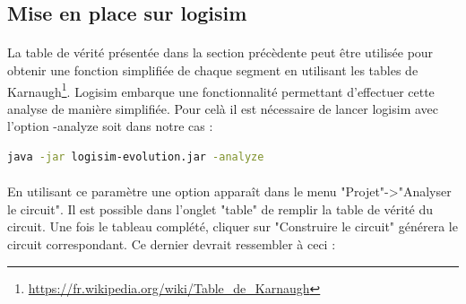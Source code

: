 \subsection{Mise en place sur logisim}
\paragraph{}
La table de vérité présentée dans la section précèdente peut être utilisée pour obtenir une fonction simplifiée de chaque segment en utilisant les tables de Karnaugh\footnote{\url{https://fr.wikipedia.org/wiki/Table_de_Karnaugh}}. Logisim embarque une fonctionnalité permettant d'effectuer cette analyse de manière simplifiée. Pour celà il est nécessaire de lancer logisim avec l'option -analyze soit dans notre cas :

\begin{lstlisting}[language=bash]
java -jar logisim-evolution.jar -analyze
\end{lstlisting}

\paragraph{}
En utilisant ce paramètre une option apparaît dans le menu "Projet"->"Analyser le circuit". Il est possible dans l'onglet "table" de remplir la table de vérité du circuit. Une fois le tableau complété, cliquer sur "Construire le circuit" générera le circuit correspondant. Ce dernier devrait ressembler à ceci :


